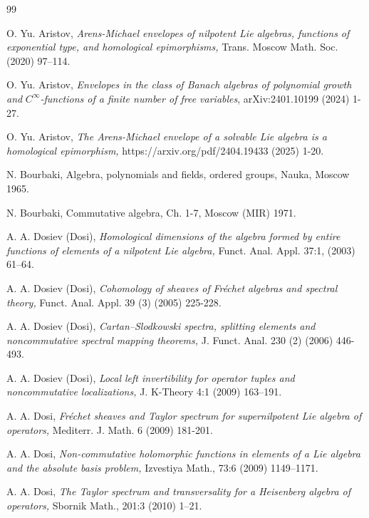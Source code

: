 \documentclass[12pt,reqno]{amsart}%
\theoremstyle{plain}
\numberwithin{theorem}{section} \numberwithin{equation}{section}
\numberwithin{lemma}{section}
\numberwithin{remark}{section}
\numberwithin{example}{section}
\numberwithin{proposition}{section}
\numberwithin{definition}{section}
\numberwithin{corollary}{section}
\begin{document}
\begin{thebibliography}{99}                                                                                               %


O. Yu. Aristov, \textit{Arens-Michael envelopes of nilpotent
Lie algebras, functions of exponential type, and homological epimorphisms,}
Trans. Moscow Math. Soc. (2020) 97--114.

O. Yu. Aristov, \textit{Envelopes in the class of Banach
algebras of polynomial growth and} $C^{\infty}$\textit{-functions of a finite
number of free variables}, arXiv:2401.10199 (2024) 1-27.

O. Yu. Aristov, \textit{The Arens-Michael envelope of a
solvable Lie algebra is a homological epimorphism, }%
https://arxiv.org/pdf/2404.19433 (2025) 1-20.

N. Bourbaki, Algebra, polynomials and fields, ordered groups,
Nauka, Moscow 1965.

N. Bourbaki, Commutative algebra, Ch. 1-7, Moscow (MIR) 1971.

A. A. Dosiev (Dosi), \textit{Homological dimensions of the
algebra formed by entire functions of elements of a nilpotent Lie algebra,}
Funct. Anal. Appl. 37:1, (2003) 61--64.

A. A. Dosiev (Dosi), \textit{Cohomology of sheaves of}
\textit{Fr\'{e}chet algebras and spectral theory, }Funct. Anal. Appl. 39 (3)
(2005) 225-228.

A. A. Dosiev (Dosi),\textit{ Cartan--Slodkowski spectra,
splitting elements and noncommutative spectral mapping theorems, }J. Funct.
Anal. 230 (2) (2006) 446-493.

A. A. Dosiev (Dosi), \textit{Local left invertibility for
operator tuples and noncommutative localizations, }J. K-Theory 4:1 (2009) 163--191.

A. A. Dosi, \textit{Fr\'{e}chet sheaves and Taylor spectrum
for supernilpotent Lie algebra of operators, }Mediterr. J. Math. 6 (2009) 181-201.

A. A. Dosi, \textit{Non-commutative holomorphic functions
in elements of a Lie algebra and the absolute basis problem, }Izvestiya Math.,
73:6 (2009) 1149--1171.

A. A. Dosi, \textit{The Taylor spectrum and transversality
for a Heisenberg algebra of operators,} Sbornik Math., 201:3 (2010) 1--21.


\end{thebibliography}
\end{document}

